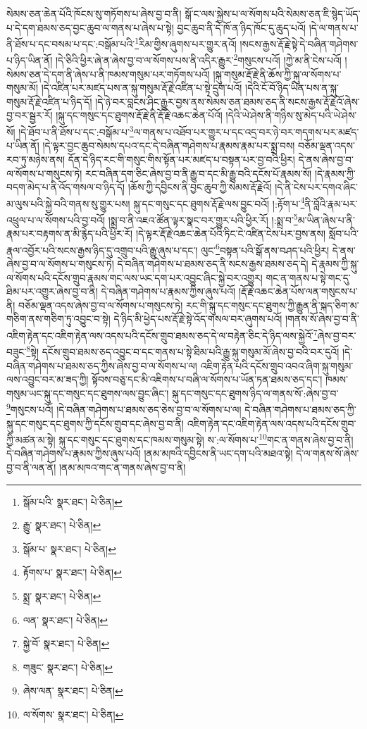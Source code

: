 སེམས་ཅན་ཆེན་པོའི་ཁོངས་སུ་གཏོགས་པ་ཞེས་བྱ་བ་ནི། སྒོ་ང་ལས་སྐྱེས་པ་ལ་སོགས་པའི་སེམས་ཅན་ཇི་སྙེད་ཡོད་པ་དེ་དག་ཐམས་ཅད་བྱང་ཆུབ་ལ་གནས་པ་ཞེས་པ་སྟེ། བྱང་ཆུབ་ནི་དེ་ཁོ་ན་ཉིད་ཁོང་དུ་ཆུད་པའོ། །དེ་ལ་གནས་པ་ནི་ཐོས་པ་དང་བསམ་པ་དང་:བསྒོམ་པའི་\footnote{སྒོམ་པའི་  སྣར་ཐང་།  པེ་ཅིན། }རིམ་གྱིས་ཞུགས་པར་གྱུར་ནའོ། །སངས་རྒྱས་རྡོ་རྗེ་སྟེ་དེ་བཞིན་གཤེགས་པ་ཉིད་ཡིན་ནོ། །དེ་ཅིའི་ཕྱིར་ཞེ་ན་ཞེས་བྱ་བ་ལ་སོགས་པས་ནི་འདིར་རྒྱུར་\footnote{རྒྱུ་  སྣར་ཐང་།  པེ་ཅིན། }གསུངས་པའོ། །ཀྱེ་མ་ནི་ངེས་པའོ། །སེམས་ཅན་དེ་དག་ནི་ཞེས་པ་ནི་ཁམས་གསུམ་པར་གཏོགས་པའོ། །སྐུ་གསུམ་རྡོ་རྗེ་ནི་ཆོས་ཀྱི་སྐུ་ལ་སོགས་པ་གསུམ་མོ། །དེ་འཛིན་པར་མཛད་པས་ན་སྐུ་གསུམ་རྡོ་རྗེ་འཛིན་པ་སྟེ་དྲུག་པའོ། །དེའི་ངོ་བོ་ཉིད་ཡིན་པས་ན་སྐུ་གསུམ་རྡོ་རྗེ་འཛིན་པ་ཉིད་དོ། །དེ་ཉེ་བར་བླངས་ཤིང་རྒྱུར་བྱས་ནས་སེམས་ཅན་ཐམས་ཅད་ནི་སངས་རྒྱས་རྡོ་རྗེའོ་ཞེས་བྱ་བར་སྦྱར་རོ། །སྐུ་དང་གསུང་དང་ཐུགས་རྡོ་རྗེ་ནི་རྡོ་རྗེ་འཆང་ཆེན་པོའོ། །དེའི་ཡེ་ཤེས་ནི་གཉིས་སུ་མེད་པའི་ཡེ་ཤེས་སོ། །དེ་ཐོབ་པ་ནི་ཐོས་པ་དང་:བསྒོམ་པ་\footnote{སྒོམ་པ་  སྣར་ཐང་།  པེ་ཅིན། }ལ་གནས་པ་འཐོབ་པར་གྱུར་པ་དང་འདྲ་བར་ཉེ་བར་གདགས་པར་མཛད་པ་ཡིན་ནོ། །དེ་ལྟར་བྱང་ཆུབ་སེམས་དཔའ་དང་དེ་བཞིན་གཤེགས་པ་རྣམས་རྣམ་པར་སྨྲ་བས། བཅོམ་ལྡན་འདས་རབ་ཏུ་མཉེས་ནས། དོན་དེ་ཉིད་རང་གི་གསུང་གིས་སྟོན་པར་མཛད་པ་བསྟན་པར་བྱ་བའི་ཕྱིར། དེ་ནས་ཞེས་བྱ་བ་ལ་སོགས་པ་གསུངས་ཏེ། རང་བཞིན་དག་ཅིང་ཞེས་བྱ་བ་ནི་རྒྱུ་བ་དང་མི་རྒྱུ་བའི་དངོས་པོ་རྣམས་སོ། །དེ་རྣམས་ཀྱི་བདག་མེད་པ་ནི་འོད་གསལ་བ་ཉིད་དོ། །ཆོས་ཀྱི་དབྱིངས་ནི་བྱང་ཆུབ་ཀྱི་སེམས་རྡོ་རྗེའོ། །དེ་ནི་ངེས་པར་དགའ་ཞིང་མ་ལུས་པའི་སྐྱེ་བའི་གནས་སུ་གྱུར་པས། སྐུ་དང་གསུང་དང་ཐུགས་རྡོ་རྗེ་ལས་བྱུང་བའོ། །:རྟོག་པ་\footnote{རྟོགས་པ་  སྣར་ཐང་།  པེ་ཅིན། }ནི་བློའི་རྣམ་པར་འཕྲུལ་པ་ལ་སོགས་པའི་བྱ་བའོ། །སྨྲ་བ་ནི་འཇའ་ཚོན་ལྟར་སྣང་བར་གྱུར་པའི་ཕྱིར་རོ། །:སྨྲ་བ་\footnote{སྨྲ་  སྣར་ཐང་།  པེ་ཅིན། }མ་ཡིན་ཞེས་པ་ནི་རྣམ་པར་བརྟགས་ན་མི་རྙེད་པའི་ཕྱིར་རོ། །དེ་ལྟར་རྡོ་རྗེ་འཆང་ཆེན་པོའི་ཏིང་ངེ་འཛིན་ངེས་པར་བྱས་ནས། སློབ་པའི་རྣལ་འབྱོར་པའི་སངས་རྒྱས་ཉིད་དུ་འགྲུབ་པའི་རྒྱུ་ཞུས་པ་དང་། ལུང་\footnote{ལན་  སྣར་ཐང་།  པེ་ཅིན། }བསྟན་པའི་སྒོ་ནས་བཤད་པའི་ཕྱིར། དེ་ནས་ཞེས་བྱ་བ་ལ་སོགས་པ་གསུངས་ཏེ། དེ་བཞིན་གཤེགས་པ་ཐམས་ཅད་ནི་སངས་རྒྱས་ཐམས་ཅད་དེ། དེ་རྣམས་ཀྱི་སྐུ་ལ་སོགས་པའི་དངོས་གྲུབ་རྣམས་གང་ལས་ཡང་དག་པར་འབྱུང་ཞིང་སྐྱེ་བར་འགྱུར། གང་ན་གནས་པ་སྟེ་གང་དུ་ཐིམ་པར་འགྱུར་ཞེས་བྱ་བ་ནི། དེ་བཞིན་གཤེགས་པ་རྣམས་ཀྱིས་ཞུས་པའོ། །རྡོ་རྗེ་འཆང་ཆེན་པོས་ལན་གསུངས་པ་ནི། བཅོམ་ལྡན་འདས་ཞེས་བྱ་བ་ལ་སོགས་པ་གསུངས་ཏེ། རང་གི་སྐུ་དང་གསུང་དང་ཐུགས་ཀྱི་རྒྱུན་ནི་སྐད་ཅིག་མ་གཅིག་ནས་གཅིག་ཏུ་འབྱུང་བ་སྟེ། དེ་ཉིད་མི་ཕྱེད་པས་རྡོ་རྗེ་སྟེ་འོད་གསལ་བར་ཞུགས་པའོ། །གནས་སོ་ཞེས་བྱ་བ་ནི་འཇིག་རྟེན་དང་འཇིག་རྟེན་ལས་འདས་པའི་དངོས་གྲུབ་ཐམས་ཅད་དེ་ལ་བརྟེན་ཅིང་དེ་ཉིད་ལས་སྐྱེའོ་\footnote{སྐྱེ་བོ་  སྣར་ཐང་།  པེ་ཅིན། }ཞེས་བྱ་བར་བཟུང་\footnote{གཟུང་  སྣར་ཐང་།  པེ་ཅིན། }སྟེ། དངོས་གྲུབ་ཐམས་ཅད་འབྱུང་བ་དང་གནས་པ་སྟེ་ཐིམ་པའི་རྒྱུ་སྐུ་གསུམ་མོ་ཞེས་བྱ་བའི་བར་དུའོ། །དེ་བཞིན་གཤེགས་པ་ཐམས་ཅད་ཀྱིས་ཞེས་བྱ་བ་ལ་སོགས་པ་ལ། འཇིག་རྟེན་པའི་དངོས་གྲུབ་འབའ་ཞིག་སྐུ་གསུམ་ལས་འབྱུང་བར་མ་ཟད་ཀྱི། སྟོབས་བཅུ་དང་མི་འཇིགས་པ་བཞི་ལ་སོགས་པ་ཡོན་ཏན་ཐམས་ཅད་དང་། ཁམས་གསུམ་ཡང་སྐུ་དང་གསུང་དང་ཐུགས་ལས་བྱུང་ཞིང་། སྐུ་དང་གསུང་དང་ཐུགས་ཉིད་ལ་གནས་སོ་:ཞེས་བྱ་བ་\footnote{ཞེས་ལན་  སྣར་ཐང་།  པེ་ཅིན། }གསུངས་པའོ། །དེ་བཞིན་གཤེགས་པ་ཐམས་ཅད་ཅེས་བྱ་བ་ལ་སོགས་པ་ལ། དེ་བཞིན་གཤེགས་པ་ཐམས་ཅད་ཀྱི་སྐུ་དང་གསུང་དང་ཐུགས་ཀྱི་དངོས་གྲུབ་དང་ཞེས་བྱ་བ་ནི། འཇིག་རྟེན་དང་འཇིག་རྟེན་ལས་འདས་པའི་དངོས་གྲུབ་ཀྱི་མཚན་མ་སྟེ། སྐུ་དང་གསུང་དང་ཐུགས་དང་ཁམས་གསུམ་སྟེ། ས་:ལ་སོགས་པ་\footnote{ལ་སོགས་  སྣར་ཐང་།  པེ་ཅིན། }གང་ན་གནས་ཞེས་བྱ་བ་ནི། དེ་བཞིན་གཤེགས་པ་རྣམས་ཀྱིས་ཞུས་པའོ། །ནམ་མཁའི་དབྱིངས་ནི་ཡང་དག་པའི་མཐའ་སྟེ། དེ་ལ་གནས་སོ་ཞེས་བྱ་བ་ནི་ལན་ནོ། །ནམ་མཁའ་གང་ན་གནས་ཞེས་བྱ་བ་ནི། 